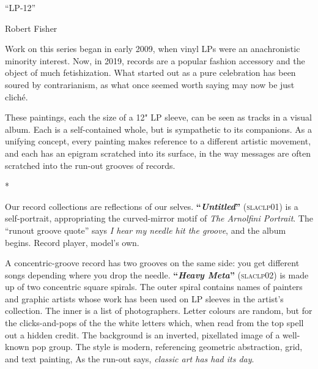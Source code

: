 \documentclass[a3paper]{article}
\begin{document}
\begin{multicols}{5}

\vspace*{20mm}

\begin{center}
\huge ``LP-12''
\bigskip

\Large Robert Fisher
\end{center}

\bigskip

Work on this series began in early 2009, when vinyl LPs were an anachronistic
  minority interest. Now, in 2019, records are a popular fashion accessory and
  the object of much fetishization. What started out as a pure celebration has
  been soured by contrarianism, as what once seemed worth saying may now be
  just clich\'e.

These paintings, each the size of a 12" LP sleeve, can be seen as tracks in a
  visual album.  Each is a self-contained whole, but is sympathetic to its
  companions. As a unifying concept, every painting makes reference to a
  different artistic movement, and each has an epigram scratched into its
  surface, in the way messages are often scratched into the run-out grooves of
  records.

\begin{center}
*
\end{center}

Our record collections are reflections of our selves.
  \textbf{``\textit{Untitled}''} (\textsc{slaclp01}) is a self-portrait,
  appropriating the curved-mirror motif of \textit{The Arnolfini Portrait}.
  The ``runout groove quote'' says \textit{I hear my needle hit the groove},
  and the album begins. Record player, model's own.

A concentric-groove record has two grooves on the same side: you get different
  songs depending where you drop the needle.  \textbf{``\textit{Heavy Meta}''}
  (\textsc{slaclp02}) is made up of two concentric square spirals. The outer
  spiral contains names of painters and graphic artists whose work has been
  used on LP sleeves in the artist's collection. The inner is a list of
  photographers. Letter colours are random, but for the clicks-and-pops of the
  the white letters which, when read from the top spell out a hidden credit.
  The background is an inverted, pixellated image of a well-known pop group.
  The style is modern, referencing geometric abstraction, grid, and text
  painting, As the run-out says, \textit{classic art has had its day}.


\end{multicols}
\end{document}
